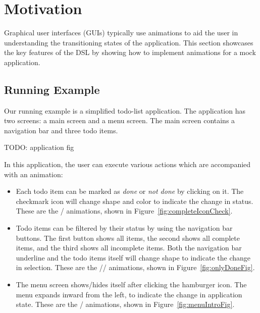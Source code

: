 \section{Motivation}
\label{sec:motivation}

Graphical user interfaces (GUIs) typically use animations to aid the user in understanding the transitioning states of the application. This section showcases the key features of the DSL by showing how to implement animations for a mock application.

\subsection{Running Example}

Our running example is a simplified todo-list application. The application has two screens: a main screen and a menu screen. The main screen contains a navigation bar and three todo items.

TODO: application fig

In this application, the user can execute various actions which are accompanied with an animation:
\begin{itemize}
\item Each todo item can be marked as \emph{done} or \emph{not done} by clicking on it. The checkmark icon will change shape and color to indicate the change in status. These are the / animations, shown in Figure~\ref{fig:completeIconCheck}.
\item Todo items can be filtered by their status by using the navigation bar buttons. The first button shows all items, the second shows all complete items, and the third shows all incomplete items. Both the navigation bar underline and the todo items itself will change shape to indicate the change in selection. These are the // animations, shown in Figure~\ref{fig:onlyDoneFig}.
\item The menu screen shows/hides itself after clicking the hamburger icon. The menu expands inward from the left, to indicate the change in application state. These are the / animations, shown in Figure~\ref{fig:menuIntroFig}.
\end{itemize}

